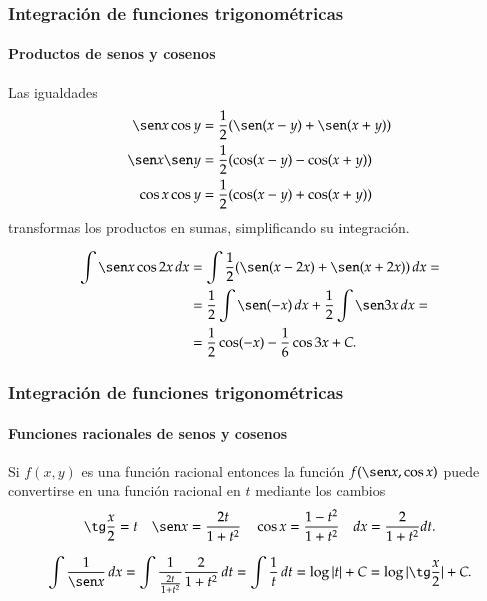 \begin{frame}
\frametitle{Integración de funciones trigonométricas}
\framesubtitle{Productos de senos y cosenos}
Las igualdades
\begin{align*}
\sen x\cos y &= \frac{1}{2}(\sen(x-y)+\sen(x+y))\\
\sen x\sen y &= \frac{1}{2}(\cos(x-y)-\cos(x+y))\\
\cos x\cos y &= \frac{1}{2}(\cos(x-y)+\cos(x+y))
\end{align*}
transformas los productos en sumas, simplificando su integración.

\begin{align*}
\int \sen x\cos 2x\, dx &= \int \frac{1}{2}(\sen(x-2x)+\sen(x+2x))\,dx = \\
&= \frac{1}{2}\int \sen (-x)\,dx +\frac{1}{2}\int \sen 3x\,dx = \\
&= \frac{1}{2}\cos(-x)- \frac{1}{6}\cos 3x +C.
\end{align*}
\end{frame}


\begin{frame}
\frametitle{Integración de funciones trigonométricas}
\framesubtitle{Funciones racionales de senos y cosenos}
Si $f(x,y)$ es una función racional entonces la función $f(\sen x,\cos x)$ puede convertirse en una función racional en
$t$ mediante los cambios
\[
\tg \frac{x}{2}=t \quad \sen x=\frac{2t}{1+t^2} \quad \cos x = \frac{1-t^2}{1+t^2} \quad dx = \frac{2}{1+t^2}dt. 
\]

\[
\int \frac{1}{\sen x}\,dx = \int \frac{1}{\frac{2t}{1+t^2}}\frac{2}{1+t^2}\,dt = \int \frac{1}{t}\,dt = \log|t|+C =
\log|\tg\frac{x}{2}|+C.
\]
\end{frame}